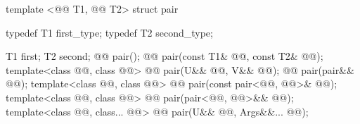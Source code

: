 \documentclass[american,twoside]{book}
\begin{document}
%
\begin{codeblock}
template <@@ T1, @@ T2>
struct pair {
  typedef T1 first_type;
  typedef T2 second_type;

  T1 first;
  T2 second;
  @@ pair();
  @@ pair(const T1& @@, const T2& @@);
  template<class @@, class @@>
    @@ 
    pair(U&& @@, V&& @@);
  @@ pair(pair&& @@);
  template<class @@, class @@> 
    @@
    pair(const pair<@@, @@>& @@);
  template<class @@, class @@> 
    @@
    pair(pair<@@, @@>&& @@);  
  template<class @@, class... @@> 
    @@
    pair(U&& @@, Args&&... @@);
  
}
\end{codeblock}
\end{document}
